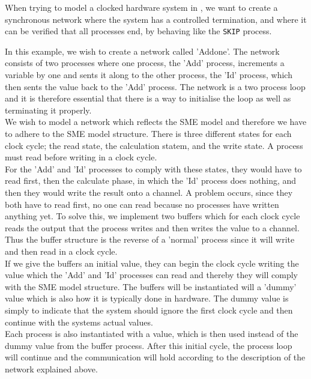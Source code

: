 When trying to model a clocked hardware system in \cspm{}, we want to create a synchronous network where the system has a controlled termination, and where it can be verified that all processes end, by behaving like the \texttt{SKIP} process.

In this example, we wish to create a network called 'Addone'. The network consists of two processes where one process, the 'Add' process, increments a variable by one and sents it along to the other process, the 'Id' process, which then sents the value back to the 'Add' process.
The network is a two process loop and it is therefore essential that there is a way to initialise the loop as well as terminating it properly.\\

We wish to model a \cspm{} network which reflects the SME model and therefore we have to adhere to the SME model structure. There is three different states for each clock cycle; the read state, the calculation statem, and the write state. A process must read before writing in a clock cycle.\\
For the 'Add' and 'Id' processes to comply with these states, they would have to read first, then the calculate phase, in which the 'Id' process does nothing, and then they would write the result onto a channel. A problem occurs, since they both have to read first, no one can read because no processes have written anything yet. To solve this, we implement two buffers which for each clock cycle reads the output that the process writes and then writes the value to a channel. Thus the buffer structure is the reverse of a 'normal' process since it will write and then read in a clock cycle. \\
If we give the buffers an initial value, they can begin the clock cycle writing the value which the 'Add' and 'Id' processes can read and thereby they will comply with the SME model structure.
The buffers will be instantiated will a 'dummy' value which is also how it is typically done in hardware. The dummy value is simply to indicate that the system should ignore the first clock cycle and then continue with the systems actual values. \\
Each process is also instantiated with a value, which is then used instead of the dummy value from the buffer process. After this initial cycle, the process loop will continue and the communication will hold according to the description of the network explained above.\\\\


